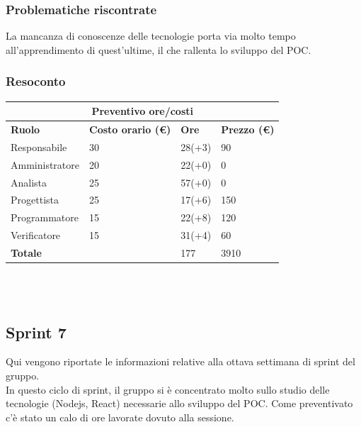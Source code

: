 \documentclass[12pt]{article}
\begin{document}
\subsubsection{Problematiche riscontrate}
La mancanza di conoscenze delle tecnologie porta via molto tempo all'apprendimento di quest'ultime, il che rallenta lo sviluppo del POC.
\subsubsection{Resoconto}
\begin{center}
	\begin{tabularx}{\textwidth}{|X|X|X|X|}
		\hline
		\multicolumn{4}{|c|}{\textbf{Preventivo ore/costi}}                                      \\
		\hline
		\hline
		\textbf{Ruolo}  & \textbf{Costo orario (\euro)} & \textbf{Ore} & \textbf{Prezzo (\euro)} \\
		\hline
		Responsabile    & 30                            & 28(+3)       & 90                      \\
		\hline
		Amministratore  & 20                            & 22(+0)       & 0                       \\
		\hline
		Analista        & 25                            & 57(+0)       & 0                       \\
		\hline
		Progettista     & 25                            & 17(+6)       & 150                     \\
		\hline
		Programmatore   & 15                            & 22(+8)       & 120                     \\
		\hline
		Verificatore    & 15                            & 31(+4)       & 60                      \\
		\hline
		\hline
		\textbf{Totale} &                               & 177          & 3910                    \\
		\hline
	\end{tabularx}\\[8pt]
	\mbox{}\\
\end{center}

\subsection{Sprint 7}
Qui vengono riportate le informazioni relative alla ottava settimana di sprint del gruppo. \\
In questo ciclo di sprint, il gruppo si è concentrato molto sullo studio delle tecnologie (Nodejs, React) necessarie allo sviluppo del POC. Come preventivato c'è stato un calo di ore lavorate dovuto alla sessione.\\
\end{document}
